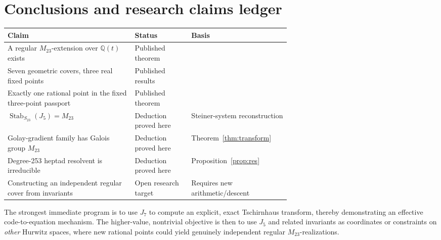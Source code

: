 \documentclass[11pt,letterpaper]{article}
\theoremstyle{definition}
\newcommand{\QQ}{\mathbb{Q}}
\newcommand{\Stab}{\operatorname{Stab}}
\begin{document}
\section{Conclusions and research claims ledger}
\begin{center}
\small
\begin{tabularx}{\linewidth}{@{}p{0.45\linewidth}p{0.2\linewidth}X@{}}\toprule
Claim & Status & Basis\\\midrule
A regular \(M_{23}\)-extension over \(\QQ(t)\) exists & Published theorem & \cite{HJLPPZ26}\\
Seven geometric covers, three real fixed points & Published results & \cite{HJLPPZ26,Janik26}\\
Exactly one rational point in the fixed three-point passport & Published theorem & \cite[\S3.7]{HJLPPZ26}\\
\(\Stab_{S_{23}}(J_5)=M_{23}\) & Deduction proved here & Steiner-system reconstruction\\
Golay-gradient family has Galois group \(M_{23}\) & Deduction proved here & Theorem~\ref{thm:transform}\\
Degree-253 heptad resolvent is irreducible & Deduction proved here & Proposition~\ref{prop:res}\\
Constructing an independent regular cover from invariants & Open research target & Requires new arithmetic/descent\\\bottomrule
\end{tabularx}
\end{center}

The strongest immediate program is to use \(J_7\) to compute an explicit, exact Tschirnhaus transform, thereby demonstrating an effective code-to-equation mechanism. The higher-value, nontrivial objective is then to use \(J_5\) and related invariants as coordinates or constraints on \emph{other} Hurwitz spaces, where new rational points could yield genuinely independent regular \(M_{23}\)-realizations.

\appendix
\end{document}
